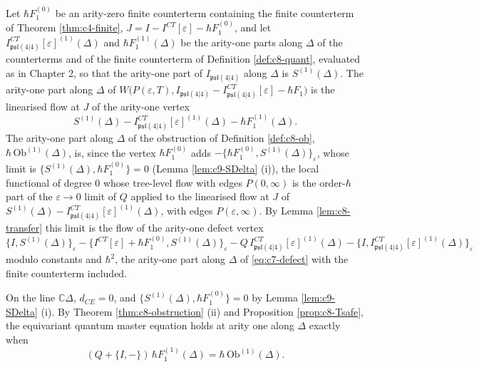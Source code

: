 \begin{definition}
\label{def:c9-data}
Let $\hbar F_1^{(0)}$ be an arity-zero finite counterterm containing the finite counterterm of Theorem \ref{thm:c4-finite}, $J=I-I^{CT}[\varepsilon]-\hbar F_1^{(0)}$, and let $I^{CT}_{\mathfrak{psl}(4|4)}[\varepsilon]^{(1)}(\Delta)$ and $\hbar F_1^{(1)}(\Delta)$ be the arity-one parts along $\Delta$ of the counterterms and of the finite counterterm of Definition \ref{def:c8-quant}, evaluated as in Chapter 2, so that the arity-one part of $I_{\mathfrak{psl}(4|4)}$ along $\Delta$ is $S^{(1)}(\Delta)$. The arity-one part along $\Delta$ of $W\big(P(\varepsilon,T),I_{\mathfrak{psl}(4|4)}-I^{CT}_{\mathfrak{psl}(4|4)}[\varepsilon]-\hbar F_1\big)$ is the linearised flow at $J$ of the arity-one vertex
\[
S^{(1)}(\Delta)-I^{CT}_{\mathfrak{psl}(4|4)}[\varepsilon]^{(1)}(\Delta)-\hbar F_1^{(1)}(\Delta).
\]
The arity-one part along $\Delta$ of the obstruction of Definition \ref{def:c8-ob}, $\hbar\,\mathrm{Ob}^{(1)}(\Delta)$, is, since the vertex $\hbar F_1^{(0)}$ adds $-\{\hbar F_1^{(0)},S^{(1)}(\Delta)\}_\varepsilon$, whose limit is $\{S^{(1)}(\Delta),\hbar F_1^{(0)}\}=0$ (Lemma \ref{lem:c9-SDelta} (i)), the local functional of degree $0$ whose tree-level flow with edges $P(0,\infty)$ is the order-$\hbar$ part of the $\varepsilon\to0$ limit of $Q$ applied to the linearised flow at $J$ of $S^{(1)}(\Delta)-I^{CT}_{\mathfrak{psl}(4|4)}[\varepsilon]^{(1)}(\Delta)$, with edges $P(\varepsilon,\infty)$. By Lemma \ref{lem:c8-transfer} this limit is the flow of the arity-one defect vertex
\[
\{I,S^{(1)}(\Delta)\}_\varepsilon-\big\{I^{CT}[\varepsilon]+\hbar F_1^{(0)},S^{(1)}(\Delta)\big\}_\varepsilon-Q\,I^{CT}_{\mathfrak{psl}(4|4)}[\varepsilon]^{(1)}(\Delta)-\big\{I,I^{CT}_{\mathfrak{psl}(4|4)}[\varepsilon]^{(1)}(\Delta)\big\}_\varepsilon
\]
modulo constants and $\hbar^2$, the arity-one part along $\Delta$ of \eqref{eq:c7-defect} with the finite counterterm included.
\end{definition}

On the line $\mathbb C\Delta$, $d_{CE}=0$, and $\{S^{(1)}(\Delta),\hbar F_1^{(0)}\}=0$ by Lemma \ref{lem:c9-SDelta} (i). By Theorem \ref{thm:c8-obstruction} (ii) and Proposition \ref{prop:c8-Tsafe}, the equivariant quantum master equation holds at arity one along $\Delta$ exactly when
\begin{equation}
(Q+\{I,-\})\,\hbar F_1^{(1)}(\Delta)=\hbar\,\mathrm{Ob}^{(1)}(\Delta).
\label{eq:c9-arity1}
\end{equation}

